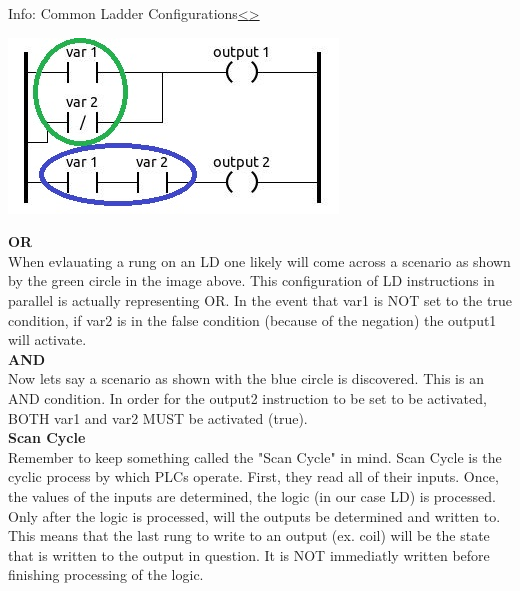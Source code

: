 \documentclass[12pt]{extarticle}
\newenvironment{instructionblock}{\Large\bgroup}{\egroup}
\newcounter{next}
\newcounter{prev}
\begin{document}
\pagebreak
{}
\begin{slide}{Info: Common Ladder Configurations}{\hyperref[slide \theprev]{\textless}\hyperref[slide \thenext]{\textgreater}}
	\begin{instructionblock}
		\begin{center}
			\includegraphics[scale=1.6]{figures/LadderDiagram05.JPG}
		\end{center}
	\end{instructionblock}
\end{slide}
\vfill
\noindent
\textbf{OR}\\
When evlauating a rung on an LD one likely will come across a scenario as shown by the green circle in the image above. This configuration of LD instructions in parallel is actually representing OR. In the event that var1 is NOT set to the true condition, if var2 is in the false condition (because of the negation) the output1 will activate.\\
\textbf{AND}\\
Now lets say a scenario as shown with the blue circle is discovered. This is an AND condition. In order for the output2 instruction to be set to be activated, BOTH var1 and var2 MUST be activated (true).\\
\textbf{Scan Cycle}\\
Remember to keep something called the "Scan Cycle" in mind. Scan Cycle is the cyclic process by which PLCs operate. First, they read all of their inputs. Once, the values of the inputs are determined, the logic (in our case LD) is processed. Only after the logic is processed, will the outputs be determined and written to. This means that the last rung to write to an output (ex. coil) will be the state that is written to the output in question. It is NOT immediatly written before finishing processing of the logic. \cite{PLC_acad}
\end{document}
